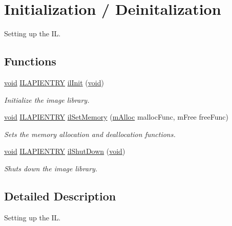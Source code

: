 \hypertarget{group__setup}{\section{Initialization / Deinitalization}
\label{group__setup}
}


Setting up the I\+L.  


\subsection*{Functions}
\begin{DoxyCompactItemize}
\item 
\hyperlink{_i_l_8h_a5530e04d947bcddd83639ea7940faf10}{void} \hyperlink{_i_l_8h_a69c08a8d06df986f7e46f209d131ef2f}{I\+L\+A\+P\+I\+E\+N\+T\+R\+Y} \hyperlink{group__setup_gac4eeea2ec690f1c38ba24c9a0b284811}{il\+Init} (\hyperlink{_i_l_8h_a5530e04d947bcddd83639ea7940faf10}{void})
\begin{DoxyCompactList}\small\item\em Initialize the image library. \end{DoxyCompactList}\item 
\hyperlink{_i_l_8h_a5530e04d947bcddd83639ea7940faf10}{void} \hyperlink{_i_l_8h_a69c08a8d06df986f7e46f209d131ef2f}{I\+L\+A\+P\+I\+E\+N\+T\+R\+Y} \hyperlink{group__setup_ga5cb1805053b3380b59b05655c71b8b45}{il\+Set\+Memory} (\hyperlink{_i_l_8h_a3e5d6d09d93e8d0031e8f3b95e3538b0}{m\+Alloc} malloc\+Func, m\+Free free\+Func)
\begin{DoxyCompactList}\small\item\em Sets the memory allocation and deallocation functions. \end{DoxyCompactList}\item 
\hyperlink{_i_l_8h_a5530e04d947bcddd83639ea7940faf10}{void} \hyperlink{_i_l_8h_a69c08a8d06df986f7e46f209d131ef2f}{I\+L\+A\+P\+I\+E\+N\+T\+R\+Y} \hyperlink{group__setup_gaf094c9f19b5e285c599e3fa3d7ea2514}{il\+Shut\+Down} (\hyperlink{_i_l_8h_a5530e04d947bcddd83639ea7940faf10}{void})
\begin{DoxyCompactList}\small\item\em Shuts down the image library. \end{DoxyCompactList}\end{DoxyCompactItemize}


\subsection{Detailed Description}
Setting up the I\+L. 



